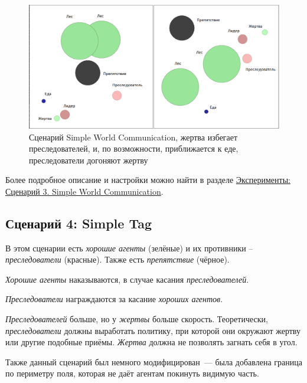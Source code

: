 \begin{figure}[ht!]
    \center
    \includegraphics [scale=0.41] {my_folder/images/intro/swc.png}
    \caption{Сценарий Simple World Communication, жертва избегает преследователей, и, по возможности, приближается к еде, преследователи догоняют жертву}
    \label{fig:swc}
\end{figure}

Более подробное описание и настройки можно найти в разделе \hyperref[exp-swc]{Эксперименты: Сценарий 3. Simple World Communication}.

\subsection{Сценарий 4: Simple Tag} \label{intro-st}

В этом сценарии есть \textit{хорошие агенты} (зелёные) и их противники – \textit{преследователи} (красные). Также есть \textit{препятствие} (чёрное).

\textit{Хорошие агенты} наказываются, в случае касания \textit{преследователей}.

\textit{Преследователи} награждаются за касание \textit{хороших агентов}.

\textit{Преследователей} больше, но у \textit{жертвы} больше скорость. Теоретически, \textit{преследователи} должны выработать политику, при которой они окружают жертву или другие подобные приёмы. \textit{Жертва} должна не позволять загнать себя в угол.

Также данный сценарий был немного модифицирован~--- была добавлена граница по периметру поля, которая не даёт агентам покинуть видимую часть.

